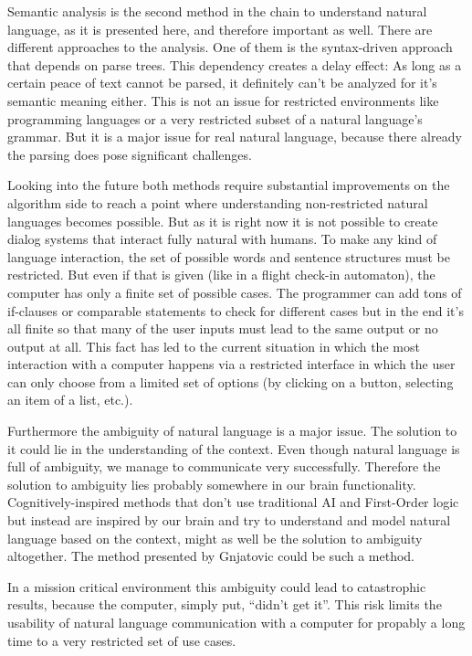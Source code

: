 \documentclass[12pt,twoside]{scrartcl}
\theoremstyle{plain}
\theoremstyle{definition}
\theoremstyle{remark}
\begin{document}
	Semantic analysis is the second method in the chain to understand natural language, as it is presented here, and therefore important as well. There are different approaches to the analysis. One of them is the syntax-driven approach that depends on parse trees. This dependency creates a delay effect: As long as a certain peace of text cannot be parsed, it definitely can't be analyzed for it's semantic meaning either. This is not an issue for restricted environments like programming languages or a very restricted subset of a natural language's grammar. But it is a major issue for real natural language, because there already the parsing does pose significant challenges.
	
	Looking into the future both methods require substantial improvements on the algorithm side to reach a point where understanding non-restricted natural languages becomes possible. But as it is right now it is not possible to create dialog systems that interact fully natural with humans. To make any kind of language interaction, the set of possible words and sentence structures must be restricted. But even if that is given (like in a flight check-in automaton), the computer has only a finite set of possible cases. The programmer can add tons of if-clauses or comparable statements to check for different cases but in the end it's all finite so that many of the user inputs must lead to the same output or no output at all. This fact has led to the current situation in which the most interaction with a computer happens via a restricted interface in which the user can only choose from a limited set of options (by clicking on a button, selecting an item of a list, etc.).
	
	Furthermore the ambiguity of natural language is a major issue. The solution to it could lie in the understanding of the context. Even though natural language is full of ambiguity, we manage to communicate very successfully. Therefore the solution to ambiguity lies probably somewhere in our brain functionality. Cognitively-inspired methods that don't use traditional AI and First-Order logic but instead are inspired by our brain and try to understand and model natural language based on the context, might as well be the solution to ambiguity altogether. The method presented by Gnjatovic\cite{Gnjatovic2012} could be such a method.
	
	In a mission critical environment this ambiguity could lead to catastrophic results, because the computer, simply put, ``didn't get it''. This risk limits the usability of natural language communication with a computer for propably a long time to a very restricted set of use cases.
	
%
%
\clearpage


\end{document}
